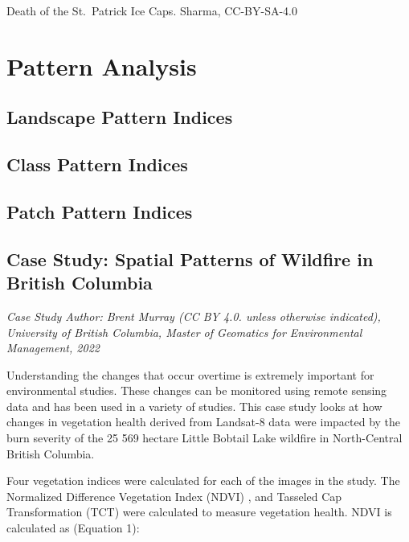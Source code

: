 \documentclass[
]{book}
\begin{document}
Death of the St.~Patrick Ice Caps. Sharma, CC-BY-SA-4.0

\hypertarget{pattern-analysis}{%
\section{Pattern Analysis}\label{pattern-analysis}}

\hypertarget{landscape-pattern-indices}{%
\subsection{Landscape Pattern Indices}\label{landscape-pattern-indices}}

\hypertarget{class-pattern-indices}{%
\subsection{Class Pattern Indices}\label{class-pattern-indices}}

\hypertarget{patch-pattern-indices}{%
\subsection{Patch Pattern Indices}\label{patch-pattern-indices}}

\hypertarget{case-study-spatial-patterns-of-wildfire-in-british-columbia}{%
\subsection{Case Study: Spatial Patterns of Wildfire in British Columbia}\label{case-study-spatial-patterns-of-wildfire-in-british-columbia}}

\emph{Case Study Author: Brent Murray (CC BY 4.0. unless otherwise indicated), University of British Columbia, Master of Geomatics for Environmental Management, 2022}

Understanding the changes that occur overtime is extremely important for environmental studies. These changes can be monitored using remote sensing data and has been used in a variety of studies. This case study looks at how changes in vegetation health derived from Landsat-8 data were impacted by the burn severity of the 25 569 hectare Little Bobtail Lake wildfire in North-Central British Columbia.

Four vegetation indices were calculated for each of the images in the study. The Normalized Difference Vegetation Index (NDVI) \citep{rouse_monitoring_1974}, and Tasseled Cap Transformation (TCT) \citep{crist_physically-based_1984} were calculated to measure vegetation health. NDVI is calculated as (Equation 1):
\end{document}
